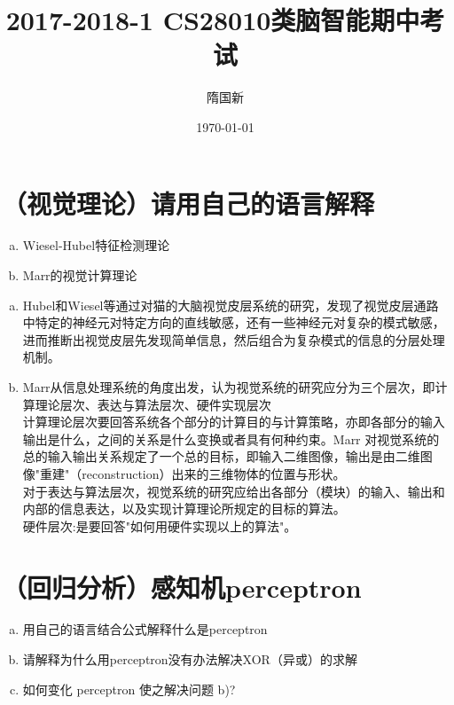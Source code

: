 \documentclass[11pt]{article}
\title{2017-2018-1 CS28010类脑智能期中考试}
\author{隋国新}
\date{\today}
\newenvironment{answer}{\par\color{MidnightBlue}}{\par}
\begin{document}
\maketitle

\section{（视觉理论）请用自己的语言解释}
\begin{enumerate}[(a)]
    \item Wiesel-Hubel特征检测理论
    \item Marr的视觉计算理论
\end{enumerate}

\begin{answer}
\begin{enumerate}[(a)]
    \item Hubel和Wiesel等通过对猫的大脑视觉皮层系统的研究，发现了视觉皮层通路中特定的神经元对特定方向的直线敏感，还有一些神经元对复杂的模式敏感，进而推断出视觉皮层先发现简单信息，然后组合为复杂模式的信息的分层处理机制。
    \item Marr从信息处理系统的角度出发，认为视觉系统的研究应分为三个层次，即计算理论层次、表达与算法层次、硬件实现层次 \\
    计算理论层次要回答系统各个部分的计算目的与计算策略，亦即各部分的输入输出是什么，之间的关系是什么变换或者具有何种约束。Marr 对视觉系统的总的输入输出关系规定了一个总的目标，即输入二维图像，输出是由二维图像"重建"（reconstruction）出来的三维物体的位置与形状。\\
    对于表达与算法层次，视觉系统的研究应给出各部分（模块）的输入、输出和内部的信息表达，以及实现计算理论所规定的目标的算法。\\
    硬件层次:是要回答"如何用硬件实现以上的算法"。
\end{enumerate}
\end{answer}

\section{（回归分析）感知机perceptron}
\begin{enumerate}[(a)]
    \item 用自己的语言结合公式解释什么是perceptron
    \item 请解释为什么用perceptron没有办法解决XOR（异或）的求解
    \item 如何变化 perceptron 使之解决问题 b)?
\end{enumerate}
\end{document}
